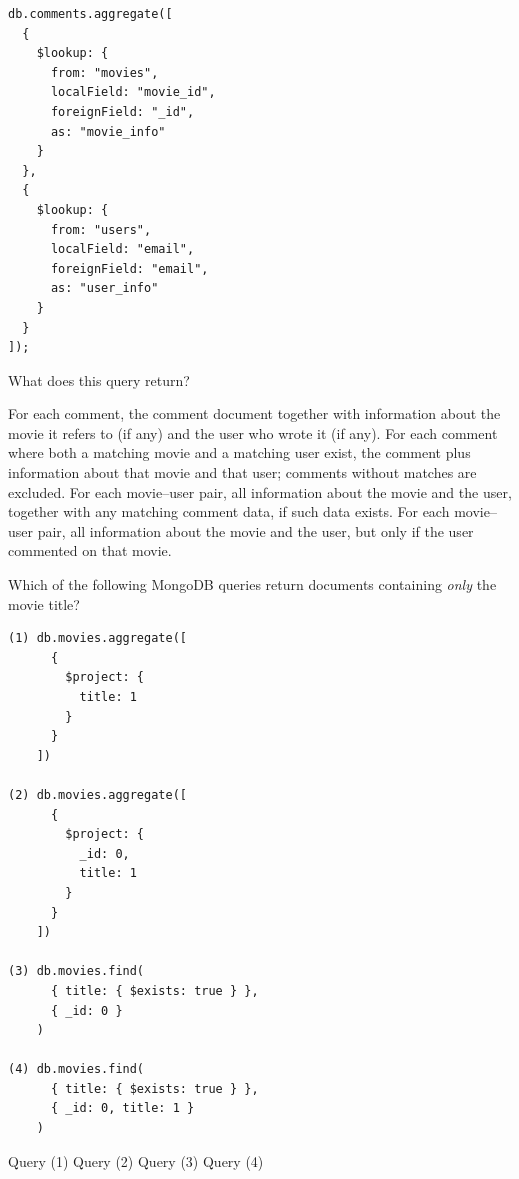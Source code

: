 \documentclass[12pt,answers]{exam}
\begin{document}
\begin{questions}
\begin{minipage}{\linewidth}
\begin{verbatim}
db.comments.aggregate([
  {
    $lookup: {
      from: "movies",
      localField: "movie_id",
      foreignField: "_id",
      as: "movie_info"
    }
  },
  {
    $lookup: {
      from: "users",
      localField: "email",
      foreignField: "email",
      as: "user_info"
    }
  }
]);
\end{verbatim}

What does this query return?

\begin{checkboxes}
    \CorrectChoice For each comment, the comment document together with information
    about the movie it refers to (if any) and the user who wrote it (if any).
    \choice For each comment where both a matching movie and a matching user exist,
    the comment plus information about that movie and that user; comments without matches are excluded.
    \choice For each movie–user pair, all information about the movie and the user,
    together with any matching comment data, if such data exists.
    \choice For each movie–user pair, all information about the movie and the user,
    but only if the user commented on that movie.
\end{checkboxes}
\end{minipage}



\begin{minipage}{\linewidth}
\question[4]
Which of the following MongoDB queries return documents containing \emph{only} the movie title?

\begin{verbatim}
(1) db.movies.aggregate([
      {
        $project: {
          title: 1
        }
      }
    ])

(2) db.movies.aggregate([
      {
        $project: {
          _id: 0,
          title: 1
        }
      }
    ])

(3) db.movies.find(
      { title: { $exists: true } },
      { _id: 0 }
    )

(4) db.movies.find(
      { title: { $exists: true } },
      { _id: 0, title: 1 }
    )
\end{verbatim}

\begin{checkboxes}
    \choice Query (1)
    \CorrectChoice Query (2)
    \choice Query (3)
    \CorrectChoice Query (4)
\end{checkboxes}
\end{minipage}




\end{questions}
\end{document}
